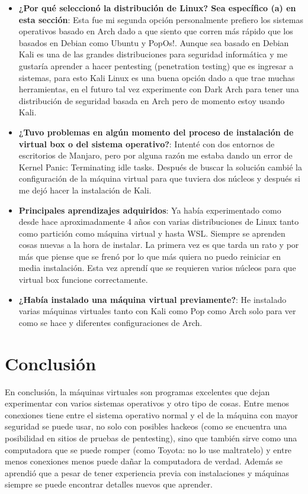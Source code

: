 \documentclass[stu, 12pt, letterpaper, donotrepeattitle, floatsintext, natbib, helv]{apa7}
\begin{document}
\begin{itemize}
    \item \textbf{¿Por qué seleccionó la distribución de Linux? Sea específico (a) en esta sección}: Esta fue mi segunda opción personalmente prefiero los sistemas operativos basado en Arch dado a que siento que corren más rápido que los basados en Debian como Ubuntu y PopOs!. Aunque sea basado en Debian Kali es una de las grandes distribuciones para seguridad informática y me gustaría aprender a hacer pentesting (penetration testing) que es ingresar a sistemas, para esto Kali Linux es una buena opción dado a que trae muchas herramientas, en el futuro tal vez experimente con Dark Arch para tener una distribución de seguridad basada en Arch pero de momento estoy usando Kali.
    \item \textbf{¿Tuvo problemas en algún momento del proceso de instalación de virtual box o del sistema operativo?}: Intenté con dos entornos de escritorios de Manjaro, pero por alguna razón me estaba dando un error de Kernel Panic: Terminating idle tasks. Después de buscar la solución cambié la configuración de la máquina virtual para que tuviera dos núcleos y después si me dejó hacer la instalación de Kali.
    \item \textbf{Principales aprendizajes adquiridos}: Ya había experimentado como desde hace aproximadamente 4 años con varias distribuciones de Linux tanto como partición como máquina virtual y hasta WSL. Siempre se aprenden cosas nuevas a la hora de instalar. La primera vez es que tarda un rato y por más que piense que se frenó por lo que más quiera no puedo reiniciar en media instalación. Esta vez aprendí que se requieren varios núcleos para que virtual box funcione correctamente.
    \item \textbf{¿Había instalado una máquina virtual previamente?}: He instalado varias máquinas virtuales tanto con Kali como Pop como Arch solo para ver como se hace y diferentes configuraciones de Arch.
\end{itemize}


\section*{Conclusión}
{}

En conclusión, la máquinas virtuales son programas excelentes que dejan experimentar con varios sistemas operativos y otro tipo de cosas. Entre menos conexiones tiene entre el sistema operativo normal y el de la máquina con mayor seguridad se puede usar, no solo con posibles hackeos (como se encuentra una posibilidad en sitios de pruebas de pentesting), sino que también sirve como una computadora que se puede romper (como Toyota: no lo use maltratelo) y entre menos conexiones menos puede dañar la computadora de verdad. Además se aprendió que a pesar de tener experiencia previa con instalaciones y máquinas siempre se puede encontrar detalles nuevos que aprender.

\newpage
\renewcommand\refname{\large\textbf{Referencias}}
% 
\end{document}
